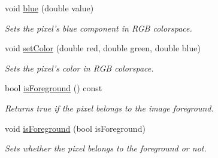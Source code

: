 \begin{CompactItemize}
void \hyperlink{class_pixel_ff3909b84c97a1c3d14a773c8825ade1}{blue} (double value)
\begin{CompactList}\small\item\em Sets the pixel's blue component in RGB colorspace. \item\end{CompactList}\item 
void \hyperlink{class_pixel_5543267a64a29c66f12a2801b101e6db}{setColor} (double red, double green, double blue)
\begin{CompactList}\small\item\em Sets the pixel's color in RGB colorspace. \item\end{CompactList}\item 
bool \hyperlink{class_pixel_48f2d29f9542f9c2ce293422ab07ffcc}{isForeground} () const 
\begin{CompactList}\small\item\em Returns true if the pixel belongs to the image foreground. \item\end{CompactList}\item 
void \hyperlink{class_pixel_1b1d5b2ed9285b837d85c33f09cab3f9}{isForeground} (bool isForeground)
\begin{CompactList}\small\item\em Sets whether the pixel belongs to the foreground or not. \item\end{CompactList}\end{CompactItemize}
